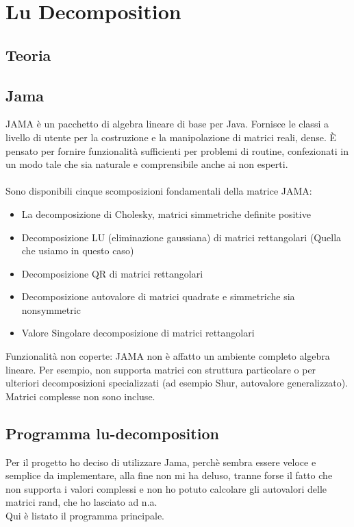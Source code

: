 \documentclass[12pt]{article}
\begin{document}
\maketitle

\section{Lu Decomposition}

\subsection{Teoria}

\subsection{Jama}
JAMA \`e un pacchetto di algebra lineare di base per Java. Fornisce le classi a livello di utente per la costruzione e la manipolazione di matrici reali, dense. \`E pensato per fornire funzionalit\`a sufficienti per problemi di routine, confezionati in un modo tale che sia naturale e comprensibile anche ai non esperti. \\
\\
Sono disponibili cinque scomposizioni fondamentali della matrice JAMA:
\begin{itemize}
\item La decomposizione di Cholesky, matrici simmetriche definite positive
\item Decomposizione LU (eliminazione gaussiana) di matrici rettangolari (Quella che usiamo in questo caso)
\item Decomposizione QR di matrici rettangolari
\item Decomposizione autovalore di matrici quadrate e simmetriche sia nonsymmetric
\item Valore Singolare decomposizione di matrici rettangolari
\end{itemize}
Funzionalit\`a non coperte: JAMA non \`e affatto un ambiente completo algebra lineare. Per esempio, non supporta matrici con struttura particolare o per ulteriori decomposizioni specializzati (ad esempio Shur, autovalore generalizzato). Matrici complesse non sono incluse. \\

\subsection{Programma lu-decomposition}
Per il progetto ho deciso di utilizzare Jama, perch\`e sembra essere veloce e semplice da implementare, alla fine non mi ha deluso, tranne forse il fatto che non supporta i valori complessi e non ho potuto calcolare gli autovalori delle matrici rand, che ho lasciato ad n.a.\\
Qui \`e listato il programma principale.
\end{document}
